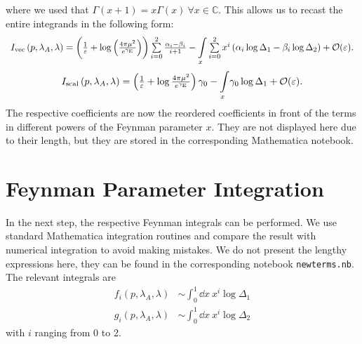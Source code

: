 \documentclass[digital, %
			   openright, %
			   parskip=half,
			   11pt]{mythesis}
\begin{document}
where we used that $\Gamma(x+1)=x\Gamma(x)\ \forall x\in \mathbb{C}$.
This allows us to recast the entire integrands in the following form:
\begin{equation}
\begin{array}{c}
I_{\mathrm{vec}}\left(p, \lambda_{A}, \lambda\right)=\left(\frac{1}{\varepsilon}+\log \left(\frac{4 \pi \mu^{2}}{e^{\gamma_{\mathrm{E}}}}\right)\right) \sum\limits_{i=0}^{2} \frac{\alpha_{i}-\beta_{i}}{i+1} 
-\mathlarger{\int}\limits_{x} \sum\limits_{i=0}^{2} x^{i}\left(\alpha_{i} \log \Delta_{1}-\beta_{i} \log \Delta_{2}\right)+\mathcal{O}(\varepsilon).
\end{array}
\end{equation}
\begin{equation}
\begin{array}{c}
I_{\mathrm{scal}}\left(p, \lambda_{A}, \lambda\right)=\left(\frac{1}{\varepsilon}+\log \frac{4 \pi \mu^{2}}{e^{\gamma_{\mathrm{E}}}}\right) \gamma_0
-\mathlarger{\int}\limits_{x} \gamma_{0} \log \Delta_{1} +\mathcal{O}(\varepsilon).
\end{array}
\end{equation}
The respective coefficients are now the reordered coefficients in front of the terms in different powers of the Feynman parameter $x$. They are not displayed here due to their length, but they are stored in the corresponding Mathematica notebook.


\section*{Feynman Parameter Integration}
In the next step, the respective Feynman integrals can be performed. We use standard Mathematica integration routines and compare the result with numerical integration to avoid making mistakes. We do not present the lengthy expressions here, they can be found in the corresponding notebook \texttt{newterms.nb}. The relevant integrals are  
\begin{align}
	f_i(p,\lambda_A, \lambda) &\sim \int_0^1 \dd x\ x^{i} \operatorname{log}\Delta_1 \\
g_i(p,\lambda_A, \lambda) &\sim \int_0^1 \dd x\ x^{i} \operatorname{log}\Delta_2
\end{align}
with $i$ ranging from 0 to 2.
\end{document}
